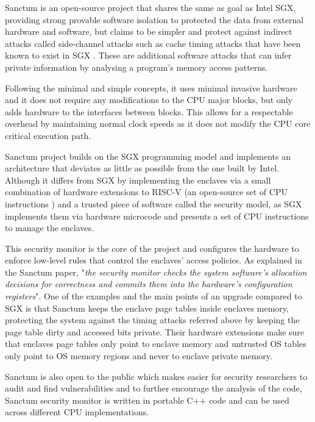 Sanctum \cite{cryptoeprint:2015:564} is an open-source project that shares the same as goal as Intel \gls{SGX}, providing strong provable software isolation to protected the data from external hardware and software, but claims to be simpler and protect against indirect attacks called side-channel attacks \cite{Khan2014} such as cache timing attacks \cite{cachetimingattaks:1} that have been known to exist in \gls{SGX} \cite{Gtzfried2017, 2017arXiv170208719S}. These are additional software attacks that can infer private information by analysing a program’s memory access patterns.

Following the minimal and simple concepts, it uses minimal invasive hardware and it does not require any modifications to the CPU major blocks, but only adds hardware to the interfaces between blocks. This allows for a respectable overhead by maintaining normal clock speeds as it does not modify the CPU core critical execution path.

Sanctum project builds on the \gls{SGX} programming model and implements an architecture that deviates as little as possible from the one built by Intel. Although it differs from \gls{SGX} by implementing the enclaves via a small combination of hardware extensions to RISC-V (an open-source set of CPU instructions \cite{Waterman14therisc-v}) and a trusted piece of software called the security model, as SGX implements them via hardware microcode and presents a set of CPU instructions to manage the enclaves.

This security monitor is the core of the project and configures the hardware to enforce low-level rules that control the enclaves’ access policies. As explained in the Sanctum paper, "\textit{the security monitor checks the system software’s allocation decisions for correctness and commits them into the hardware’s configuration registers}". One of the examples and the main points of an upgrade compared to \gls{SGX} is that Sanctum keeps the enclave page tables inside enclaves memory, protecting the system against the timing attacks referred above by keeping the page table dirty and accessed bits private. Their hardware extensions make sure that enclaves page tables only point to enclave memory and untrusted \gls{OS} tables only point to \gls{OS} memory regions and never to enclave private memory.

Sanctum is also open to the public which makes easier for security researchers to audit and find vulnerabilities and to further encourage the analysis of the code, Sanctum security monitor is written in portable C++ code and can be used across different CPU implementations.

